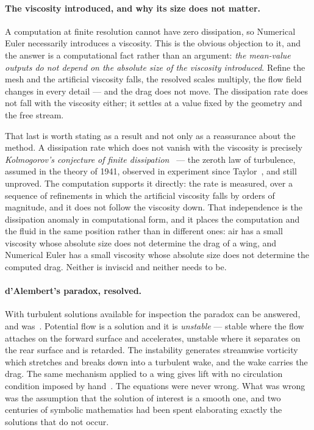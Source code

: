 \documentclass[11pt]{article}
\begin{document}
\paragraph{The viscosity introduced, and why its size does not matter.} A computation at finite
resolution cannot have zero dissipation, so Numerical Euler necessarily introduces a viscosity. This
is the obvious objection to it, and the answer is a computational fact rather than an argument:
\emph{the mean-value outputs do not depend on the absolute size of the viscosity introduced}. Refine
the mesh and the artificial viscosity falls, the resolved scales multiply, the flow field changes in
every detail --- and the drag does not move. The dissipation rate does not fall with the viscosity
either; it settles at a value fixed by the geometry and the free stream.

That last is worth stating as a result and not only as a reassurance about the method. A dissipation
rate which does not vanish with the viscosity is precisely \emph{Kolmogorov's conjecture of finite
dissipation}~\cite{kolmogorov41} --- the zeroth law of turbulence, assumed in the theory of 1941,
observed in experiment since Taylor~\cite{taylor}, and still unproved. The computation supports it
directly: the rate is measured, over a sequence of refinements in which the artificial viscosity
falls by orders of magnitude, and it does not follow the viscosity down. That independence is the
dissipation anomaly in computational form, and it places the computation and the fluid in the same
position rather than in different ones: air has a small viscosity whose absolute size does not
determine the drag of a wing, and Numerical Euler has a small viscosity whose absolute size does not
determine the computed drag. Neither is inviscid and neither needs to be.

\paragraph{d'Alembert's paradox, resolved.} With turbulent solutions available for inspection the
paradox can be answered, and was~\cite{dalembert}. Potential flow is a solution and it is
\emph{unstable} --- stable where the flow attaches on the forward surface and accelerates, unstable
where it separates on the rear surface and is retarded. The instability generates streamwise
vorticity which stretches and breaks down into a turbulent wake, and the wake carries the drag. The
same mechanism applied to a wing gives lift with no circulation condition imposed by
hand~\cite{flight}. The equations were never wrong. What was wrong was the assumption that the
solution of interest is a smooth one, and two centuries of symbolic mathematics had been spent
elaborating exactly the solutions that do not occur.
\end{document}
